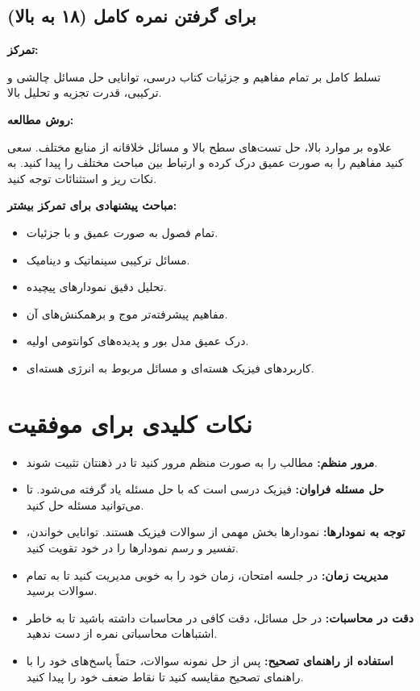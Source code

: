 \documentclass[12pt]{article}
\newcommand{\parahead}[1]{\par\vspace{0.5ex}\noindent\textbf{#1}\par\nopagebreak[4]\vspace{0.5ex}}
\begin{document}
\subsection{برای گرفتن نمره کامل (۱۸ به بالا)}

\parahead{تمرکز:}
تسلط کامل بر تمام مفاهیم و جزئیات کتاب درسی، توانایی حل مسائل چالشی و ترکیبی، قدرت تجزیه و تحلیل بالا.

\parahead{روش مطالعه:}
علاوه بر موارد بالا، حل تست‌های سطح بالا و مسائل خلاقانه از منابع مختلف. سعی کنید مفاهیم را به صورت عمیق درک کرده و ارتباط بین مباحث مختلف را پیدا کنید. به نکات ریز و استثنائات توجه کنید.

\parahead{مباحث پیشنهادی برای تمرکز بیشتر:}
\begin{itemize}
    \item تمام فصول به صورت عمیق و با جزئیات.
    \item مسائل ترکیبی سینماتیک و دینامیک.
    \item تحلیل دقیق نمودارهای پیچیده.
    \item مفاهیم پیشرفته‌تر موج و برهمکنش‌های آن.
    \item درک عمیق مدل بور و پدیده‌های کوانتومی اولیه.
    \item کاربردهای فیزیک هسته‌ای و مسائل مربوط به انرژی هسته‌ای.
\end{itemize}

\section{نکات کلیدی برای موفقیت}
\begin{itemize}
    \item \textbf{مرور منظم:} مطالب را به صورت منظم مرور کنید تا در ذهنتان تثبیت شوند.
    \item \textbf{حل مسئله فراوان:} فیزیک درسی است که با حل مسئله یاد گرفته می‌شود. تا می‌توانید مسئله حل کنید.
    \item \textbf{توجه به نمودارها:} نمودارها بخش مهمی از سوالات فیزیک هستند. توانایی خواندن، تفسیر و رسم نمودارها را در خود تقویت کنید.
    \item \textbf{مدیریت زمان:} در جلسه امتحان، زمان خود را به خوبی مدیریت کنید تا به تمام سوالات برسید.
    \item \textbf{دقت در محاسبات:} در حل مسائل، دقت کافی در محاسبات داشته باشید تا به خاطر اشتباهات محاسباتی نمره از دست ندهید.
    \item \textbf{استفاده از راهنمای تصحیح:} پس از حل نمونه سوالات، حتماً پاسخ‌های خود را با راهنمای تصحیح مقایسه کنید تا نقاط ضعف خود را پیدا کنید.
\end{itemize}
\end{document}
